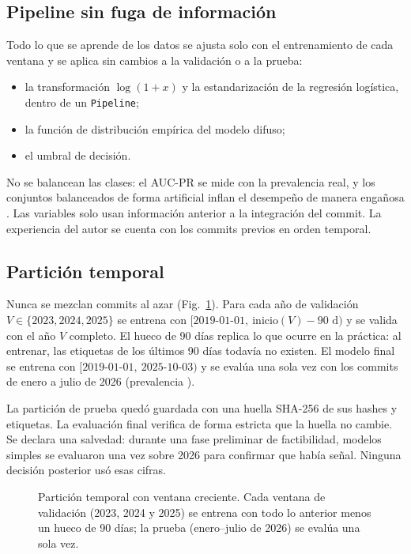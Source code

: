\subsection{Pipeline sin fuga de información}

Todo lo que se aprende de los datos se ajusta solo con el entrenamiento de cada ventana y se aplica sin cambios a la validación o a la prueba:
\begin{itemize}
\item la transformación $\log(1+x)$ y la estandarización de la regresión logística, dentro de un \texttt{Pipeline};
\item la función de distribución empírica del modelo difuso;
\item el umbral de decisión.
\end{itemize}
No se balancean las clases: el AUC-PR se mide con la prevalencia real, y los conjuntos balanceados de forma artificial inflan el desempeño de manera engañosa \cite{Nguyen2025}. Las variables solo usan información anterior a la integración del commit. La experiencia del autor se cuenta con los commits previos en orden temporal.

\subsection{Partición temporal}

Nunca se mezclan commits al azar (Fig.~\ref{fig:particion}). Para cada año de validación $V\in\{2023,2024,2025\}$ se entrena con $[\text{2019-01-01},\ \text{inicio}(V)-90\text{ d})$ y se valida con el año $V$ completo. El hueco de 90 días replica lo que ocurre en la práctica: al entrenar, las etiquetas de los últimos 90 días todavía no existen. El modelo final se entrena con $[\text{2019-01-01},\ \text{2025-10-03})$ y se evalúa una sola vez con los \cifNPrueba{} commits de enero a julio de 2026 (prevalencia \cifPrevPrueba{}).

La partición de prueba quedó guardada con una huella SHA-256 de sus hashes y etiquetas. La evaluación final verifica de forma estricta que la huella no cambie. Se declara una salvedad: durante una fase preliminar de factibilidad, modelos simples se evaluaron una vez sobre 2026 para confirmar que había señal. Ninguna decisión posterior usó esas cifras.

\begin{figure}[!t]
\centering

\caption{Partición temporal con ventana creciente. Cada ventana de validación (2023, 2024 y 2025) se entrena con todo lo anterior menos un hueco de 90 días; la prueba (enero--julio de 2026) se evalúa una sola vez.}
\label{fig:particion}
\end{figure}

